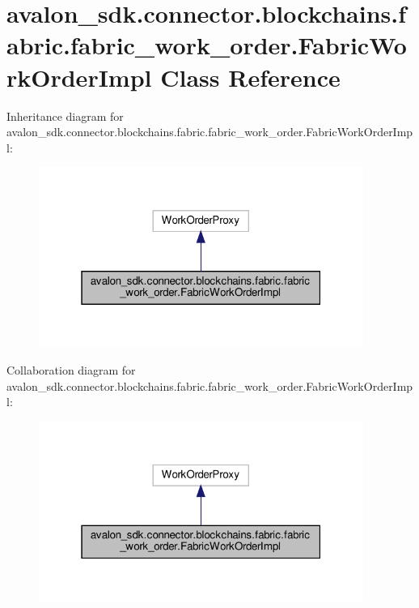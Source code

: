 \hypertarget{classavalon__sdk_1_1connector_1_1blockchains_1_1fabric_1_1fabric__work__order_1_1FabricWorkOrderImpl}{}\section{avalon\+\_\+sdk.\+connector.\+blockchains.\+fabric.\+fabric\+\_\+work\+\_\+order.\+Fabric\+Work\+Order\+Impl Class Reference}
\label{classavalon__sdk_1_1connector_1_1blockchains_1_1fabric_1_1fabric__work__order_1_1FabricWorkOrderImpl}


Inheritance diagram for avalon\+\_\+sdk.\+connector.\+blockchains.\+fabric.\+fabric\+\_\+work\+\_\+order.\+Fabric\+Work\+Order\+Impl\+:
\nopagebreak
\begin{figure}[H]
\begin{center}
\leavevmode
\includegraphics[width=301pt]{classavalon__sdk_1_1connector_1_1blockchains_1_1fabric_1_1fabric__work__order_1_1FabricWorkOrderImpl__inherit__graph}
\end{center}
\end{figure}


Collaboration diagram for avalon\+\_\+sdk.\+connector.\+blockchains.\+fabric.\+fabric\+\_\+work\+\_\+order.\+Fabric\+Work\+Order\+Impl\+:
\nopagebreak
\begin{figure}[H]
\begin{center}
\leavevmode
\includegraphics[width=301pt]{classavalon__sdk_1_1connector_1_1blockchains_1_1fabric_1_1fabric__work__order_1_1FabricWorkOrderImpl__coll__graph}
\end{center}
\end{figure}
